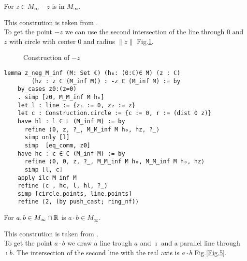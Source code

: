 \begin{lemma}
    \label{lem:construction_neg}
    \leanok
    For $z \in M_{\infty}$  $-z$ is in $M_{\infty}$.
\end{lemma}
This constrution is teken from \cite{JAN_SCHROEER:2023}.\\
To get the point $-z$ we can use the second intersection of the line through $0$ and $z$ with circle with center $0$ and radius $\|z\|$ Fig.\ref{Fig.1}.

\begin{figure}[h!]
    \centering
    \caption{Construction of $-z$}
    \label{Fig.1}
\end{figure}

\begin{lstlisting}
lemma z_neg_M_inf (M: Set ℂ) (h₀: (0:ℂ)∈ M) (z : ℂ) 
        (hz : z ∈ (M_inf M)) : -z ∈ (M_inf M) := by
    by_cases z0:(z=0)
    . simp [z0, M_M_inf M h₀]
    let l : line := {z₁ := 0, z₂ := z}
    let c : Construction.circle := {c := 0, r := (dist 0 z)}
    have hl : l ∈ L (M_inf M) := by
      refine ⟨0, z, ?_, M_M_inf M h₀, hz, ?_⟩
      simp only [l]
      simp  [eq_comm, z0]
    have hc : c ∈ C (M_inf M) := by
      refine ⟨0, 0, z, ?_, M_M_inf M h₀, M_M_inf M h₀, hz⟩
      simp [l, c]
    apply ilc_M_inf M
    refine ⟨c , hc, l, hl, ?_⟩
    simp [circle.points, line.points]
    refine ⟨2, (by push_cast; ring_nf)⟩
\end{lstlisting}

\begin{lemma}
    \label{lem:construction_mul}
    \leanok
    For $a, b \in M_{\infty}\cap\mathbb{R}$ is $a \cdot b \in M_{\infty}$.
\end{lemma}
This constrution is taken from \cite{cox2012galois}.\\
To get the point $a\cdot b$ we draw a line trough $a$ and $\imath$ and a parallel line through $\imath b$. The intersection of the second line with the real axis is $a\cdot b$ Fig.\ref{Fig.5}.

